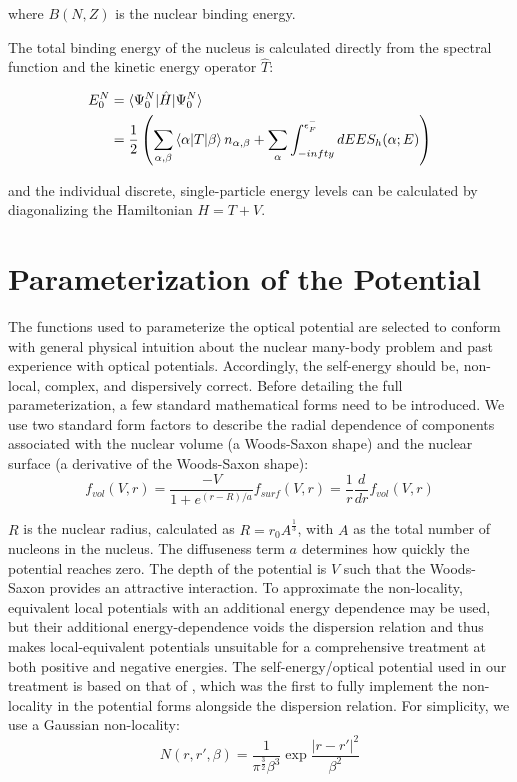\noindent
where $B(N,Z)$ is the nuclear binding energy.

The total binding energy of the nucleus is calculated directly from the spectral function and the
kinetic energy operator $\hat{T}$:

\begin{equation} \label{TotalEnergyEquation}
    \begin{split}
        E^{N}_{0} & = \braket{\Psi^{N}_{0}|\hat{H}|\Psi^{N}_{0}}\\
        & = \frac{1}{2} \left(\sum_{\alpha,\beta}\braket{\alpha|T|\beta}n_{\alpha,\beta}
        + \sum_{\alpha}\int_{-infty}^{\epsilon_{F}^{-}}dE E S_{h}(\alpha;E)\right)
    \end{split}
\end{equation}

\noindent
and the individual discrete, single-particle energy levels can be calculated by diagonalizing the
Hamiltonian $H = T + V$.

\section{Parameterization of the Potential}
The functions used to parameterize the optical potential
are selected to conform with general physical intuition about the nuclear
many-body problem and past experience with optical potentials. Accordingly,
the self-energy should be, non-local, complex, and dispersively correct.
Before detailing the full parameterization,
a few standard mathematical forms need to be introduced. We use two standard form factors
to describe the radial dependence of components
associated with the nuclear volume (a Woods-Saxon shape)
and the nuclear surface (a derivative of the Woods-Saxon shape):
\begin{equation} \label{WoodsSaxon}
    f_{vol}(V,r) = \frac{-V}{1+e^{(r-R)/a}}
    f_{surf}(V,r) = \frac{1}{r}\frac{d}{dr}f_{vol}(V,r)
\end{equation}

\noindent
$R$ is the nuclear radius, calculated as $R = r_{0}A^{\frac{1}{3}}$, with $A$ as the total number of
nucleons in the nucleus. The diffuseness term $a$ determines how quickly the potential reaches zero.
The depth of the potential is $V$ such that the Woods-Saxon
provides an attractive interaction.
To approximate the non-locality, equivalent local potentials \cite{Mahaux1991}
with an additional energy dependence may be used, but their additional energy-dependence
voids the dispersion relation and thus makes local-equivalent potentials unsuitable
for a comprehensive treatment at both positive and negative energies.
The self-energy/optical potential used in our treatment is based on that of
\cite{MahzoonPhDThesis}, which was the first to fully implement the non-locality in the potential
forms alongside the dispersion relation. For simplicity, we use a Gaussian non-locality:
\begin{equation}
    N(r, r',\beta) = \frac{1}{\pi^{\frac{3}{2}}\beta^{3}} \exp{\frac{|r-r'|^{2}}{\beta^{2}}}
\end{equation}

